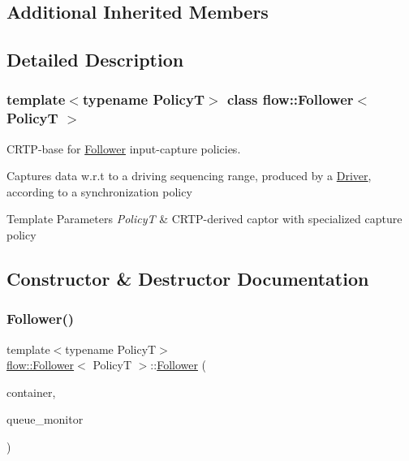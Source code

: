 \subsection*{Additional Inherited Members}


\subsection{Detailed Description}
\subsubsection*{template$<$typename PolicyT$>$\newline
class flow\+::\+Follower$<$ Policy\+T $>$}

C\+R\+T\+P-\/base for \hyperlink{classflow_1_1_follower}{Follower} input-\/capture policies. 

Captures data w.\+r.\+t to a driving sequencing range, produced by a \hyperlink{classflow_1_1_driver}{Driver}, according to a synchronization policy


\begin{DoxyTemplParams}{Template Parameters}
{\em PolicyT} & C\+R\+T\+P-\/derived captor with specialized capture policy \\
\hline
\end{DoxyTemplParams}


\subsection{Constructor \& Destructor Documentation}
\mbox{\label{classflow_1_1_follower_a3355c5acbcb1daea2fbe8e0c39f7b558}} 
\subsubsection{\texorpdfstring{Follower()}{Follower()}}
{\footnotesize\ttfamily template$<$typename PolicyT$>$ \\
\hyperlink{classflow_1_1_follower}{flow\+::\+Follower}$<$ PolicyT $>$\+::\hyperlink{classflow_1_1_follower}{Follower} (\begin{DoxyParamCaption}\item[{const \hyperlink{classflow_1_1_follower_a2c30490de514f45d9cc287eb8baed5db}{Dispatch\+Container\+Type} \&}]{container,  }\item[{const \hyperlink{classflow_1_1_follower_aa19997fc64e57b6603f167144927de45}{Dispatch\+Queue\+Monitor\+Type} \&}]{queue\+\_\+monitor }\end{DoxyParamCaption})}



